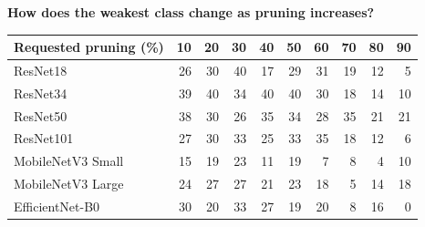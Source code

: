 \textbf{How does the weakest class change as pruning increases?}
\vspace{-4pt}\begin{center}\small\setlength{\tabcolsep}{5pt}
\begin{tabular}{@{}l*{9}{r}@{}}\toprule
Requested pruning (\%) & 10 & 20 & 30 & 40 & 50 & 60 & 70 & 80 & 90\\
\midrule
ResNet18 & \cellcolor{teal!16}26 & \cellcolor{teal!19}30 & \cellcolor{teal!25}40 & \cellcolor{teal!11}17 & \cellcolor{teal!18}29 & \cellcolor{teal!20}31 & \cellcolor{teal!12}19 & \cellcolor{teal!8}12 & \cellcolor{teal!3}5\\
ResNet34 & \cellcolor{teal!25}39 & \cellcolor{teal!25}40 & \cellcolor{teal!21}34 & \cellcolor{teal!25}40 & \cellcolor{teal!25}40 & \cellcolor{teal!19}30 & \cellcolor{teal!11}18 & \cellcolor{teal!9}14 & \cellcolor{teal!6}10\\
ResNet50 & \cellcolor{teal!24}38 & \cellcolor{teal!19}30 & \cellcolor{teal!16}26 & \cellcolor{teal!22}35 & \cellcolor{teal!21}34 & \cellcolor{teal!18}28 & \cellcolor{teal!22}35 & \cellcolor{teal!13}21 & \cellcolor{teal!13}21\\
ResNet101 & \cellcolor{teal!17}27 & \cellcolor{teal!19}30 & \cellcolor{teal!21}33 & \cellcolor{teal!16}25 & \cellcolor{teal!21}33 & \cellcolor{teal!22}35 & \cellcolor{teal!11}18 & \cellcolor{teal!8}12 & \cellcolor{teal!4}6\\
MobileNetV3 Small & \cellcolor{teal!9}15 & \cellcolor{teal!12}19 & \cellcolor{teal!14}23 & \cellcolor{teal!7}11 & \cellcolor{teal!12}19 & \cellcolor{teal!4}7 & \cellcolor{teal!5}8 & \cellcolor{teal!3}4 & \cellcolor{teal!6}10\\
MobileNetV3 Large & \cellcolor{teal!15}24 & \cellcolor{teal!17}27 & \cellcolor{teal!17}27 & \cellcolor{teal!13}21 & \cellcolor{teal!14}23 & \cellcolor{teal!11}18 & \cellcolor{teal!3}5 & \cellcolor{teal!9}14 & \cellcolor{teal!11}18\\
EfficientNet-B0 & \cellcolor{teal!19}30 & \cellcolor{teal!13}20 & \cellcolor{teal!21}33 & \cellcolor{teal!17}27 & \cellcolor{teal!12}19 & \cellcolor{teal!13}20 & \cellcolor{teal!5}8 & \cellcolor{teal!10}16 & \cellcolor{teal!0}0\\
\bottomrule\end{tabular}
\end{center}\vspace{-4pt}

